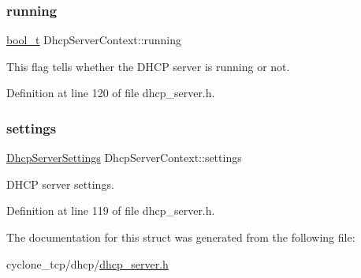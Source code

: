 \mbox{\label{structDhcpServerContext_abaf75d5113b57268dea728e946a1029b}} 
\subsubsection{\texorpdfstring{running}{running}}
{\footnotesize\ttfamily \hyperlink{compiler__port_8h_a812d16e5494522586b3784e55d479912}{bool\+\_\+t} Dhcp\+Server\+Context\+::running}



This flag tells whether the D\+H\+CP server is running or not. 



Definition at line 120 of file dhcp\+\_\+server.\+h.

\mbox{\label{structDhcpServerContext_a63471f8a788839b2b8cfdee9d97c32fb}} 
\subsubsection{\texorpdfstring{settings}{settings}}
{\footnotesize\ttfamily \hyperlink{structDhcpServerSettings}{Dhcp\+Server\+Settings} Dhcp\+Server\+Context\+::settings}



D\+H\+CP server settings. 



Definition at line 119 of file dhcp\+\_\+server.\+h.



The documentation for this struct was generated from the following file\+:\begin{DoxyCompactItemize}
\item 
cyclone\+\_\+tcp/dhcp/\hyperlink{dhcp__server_8h}{dhcp\+\_\+server.\+h}\end{DoxyCompactItemize}
